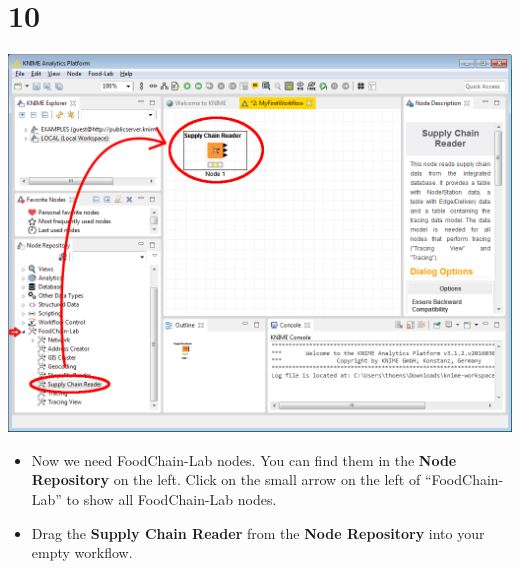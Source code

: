 \documentclass[10pt]{beamer}
\begin{document}
\section{10}
\begin{frame}
	\begin{center}
  		\includegraphics[height=0.6\textheight]{10.png}
	\end{center}
	\begin{itemize}
		\item Now we need FoodChain-Lab nodes. You can find them in the \textbf{Node Repository} on the left. Click on the small arrow on the left of ``FoodChain-Lab'' to show all FoodChain-Lab nodes.
		\item Drag the \textbf{Supply Chain Reader} from the \textbf{Node Repository} into your empty workflow.
	\end{itemize}
\end{frame}
\end{document}
